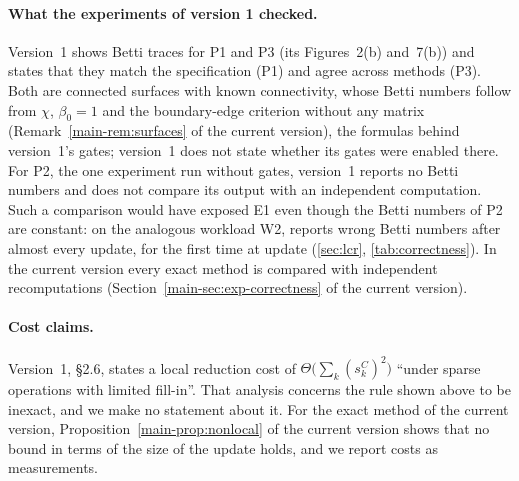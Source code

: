 \paragraph{What the experiments of version 1 checked.}
Version~1 shows Betti traces for P1 and P3 (its Figures~2(b) and~7(b)) and
states that they match the specification (P1) and agree across methods (P3).
Both are connected surfaces with
known connectivity, whose Betti numbers follow from $\chi$, $\beta_0=1$ and the
boundary-edge criterion without any matrix (Remark~\ref{main-rem:surfaces} of the current version), the
formulas behind version~1's gates; version~1 does not state whether its gates
were enabled there. For P2, the one experiment run without gates, version~1
reports no Betti numbers and does not compare its output with an independent
computation. Such a comparison would have exposed E1 even though the Betti
numbers of P2 are constant: on the analogous workload W2,  reports
wrong Betti numbers after almost every update, for the first time at update
\NumLcrWTwoNFifteenSEightFirstWrong{} (\cref{sec:lcr}, \cref{tab:correctness}). In the current version every exact method is compared with independent
recomputations (Section~\ref{main-sec:exp-correctness} of the current version).

\paragraph{Cost claims.}
Version~1, \S2.6, states a local reduction cost of
$\Theta\bigl(\sum_k (s_k^C)^2\bigr)$ ``under sparse operations with limited
fill-in''. That analysis concerns the rule shown above to be inexact, and we
make no statement about it. For the exact method of the current version,
Proposition~\ref{main-prop:nonlocal} of the current version shows that no bound in terms of the size of the
update holds, and we report costs as measurements.
